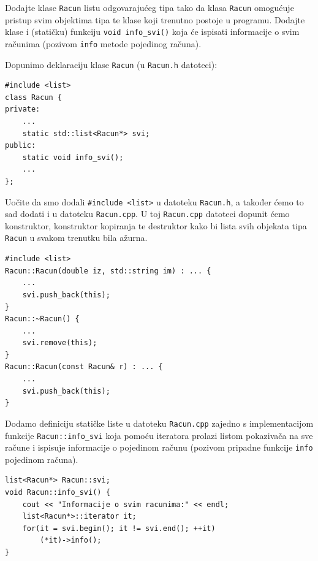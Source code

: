 \begin{zadatak}
    Dodajte klase \texttt{Racun} listu odgovarajućeg tipa tako da
    klasa \texttt{Racun} omogućuje pristup svim objektima tipa te klase koji trenutno postoje u programu.
    Dodajte klase i (statičku) funkciju \texttt{void info\_svi()}
    koja će ispisati informacije o svim računima
    (pozivom \texttt{info} metode pojedinog računa).
\end{zadatak}


\begin{rjesenje}
    Dopunimo deklaraciju klase \texttt{Racun} (u \texttt{Racun.h} datoteci):

    \begin{verbatim}
#include <list>
class Racun {
private:
    ...
    static std::list<Racun*> svi;
public:
    static void info_svi();
    ...
};
    \end{verbatim}

    Uočite da smo dodali \texttt{\#include <list>} u datoteku \texttt{Racun.h}, a također ćemo to sad dodati i u 
    datoteku \texttt{Racun.cpp}.
    U toj \texttt{Racun.cpp} datoteci dopunit ćemo konstruktor, konstruktor kopiranja te destruktor
    kako bi lista svih objekata tipa \texttt{Racun}
    u svakom trenutku bila ažurna.

    \begin{verbatim}
#include <list>
Racun::Racun(double iz, std::string im) : ... {
    ...
    svi.push_back(this);
}
Racun::~Racun() {
    ...
    svi.remove(this);
}
Racun::Racun(const Racun& r) : ... {
    ...
    svi.push_back(this);
}
    \end{verbatim}

    Dodamo definiciju statičke liste u datoteku \texttt{Racun.cpp} zajedno s implementacijom
    funkcije \texttt{Racun::info\_svi} koja pomoću
    iteratora prolazi listom pokazivača na sve račune i 
    ispisuje informacije o pojedinom računu
    (pozivom pripadne funkcije \texttt{info} pojedinom računa).

    \begin{verbatim}
list<Racun*> Racun::svi;
void Racun::info_svi() {
    cout << "Informacije o svim racunima:" << endl;
    list<Racun*>::iterator it;
    for(it = svi.begin(); it != svi.end(); ++it)
        (*it)->info();
}
    \end{verbatim}
\end{rjesenje}


